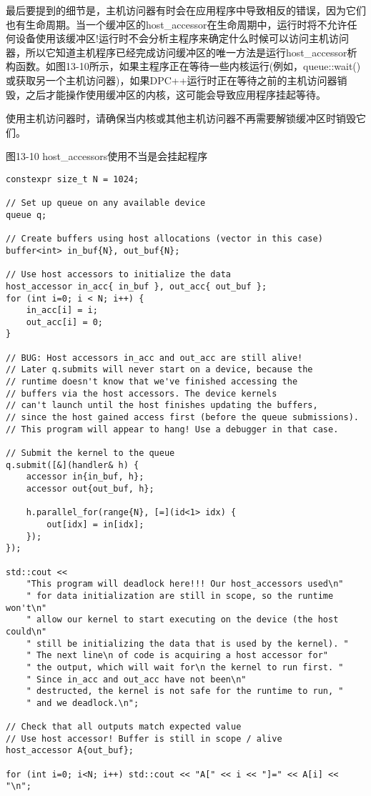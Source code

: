 最后要提到的细节是，主机访问器有时会在应用程序中导致相反的错误，因为它们也有生命周期。当一个缓冲区的host\_accessor在生命周期中，运行时将不允许任何设备使用该缓冲区!运行时不会分析主程序来确定什么时候可以访问主机访问器，所以它知道主机程序已经完成访问缓冲区的唯一方法是运行host\_accessor析构函数。如图13-10所示，如果主程序正在等待一些内核运行(例如，queue::wait()或获取另一个主机访问器)，如果DPC++运行时正在等待之前的主机访问器销毁，之后才能操作使用缓冲区的内核，这可能会导致应用程序挂起等待。\par

\begin{tcolorbox}[colback=red!5!white,colframe=red!75!black]
使用主机访问器时，请确保当内核或其他主机访问器不再需要解锁缓冲区时销毁它们。
\end{tcolorbox}

\hspace*{\fill} \par %
图13-10 host\_accessors使用不当是会挂起程序
\begin{lstlisting}[caption={}]
constexpr size_t N = 1024;

// Set up queue on any available device
queue q;

// Create buffers using host allocations (vector in this case)
buffer<int> in_buf{N}, out_buf{N};

// Use host accessors to initialize the data
host_accessor in_acc{ in_buf }, out_acc{ out_buf };
for (int i=0; i < N; i++) {
	in_acc[i] = i;
	out_acc[i] = 0;
}

// BUG: Host accessors in_acc and out_acc are still alive!
// Later q.submits will never start on a device, because the
// runtime doesn't know that we've finished accessing the
// buffers via the host accessors. The device kernels
// can't launch until the host finishes updating the buffers,
// since the host gained access first (before the queue submissions).
// This program will appear to hang! Use a debugger in that case.

// Submit the kernel to the queue
q.submit([&](handler& h) {
	accessor in{in_buf, h};
	accessor out{out_buf, h};
	
	h.parallel_for(range{N}, [=](id<1> idx) {
		out[idx] = in[idx];
	});
});

std::cout <<
	"This program will deadlock here!!! Our host_accessors used\n"
	" for data initialization are still in scope, so the runtime won't\n"
	" allow our kernel to start executing on the device (the host could\n"
	" still be initializing the data that is used by the kernel). "
	" The next line\n of code is acquiring a host accessor for"
	" the output, which will wait for\n the kernel to run first. "
	" Since in_acc and out_acc have not been\n"
	" destructed, the kernel is not safe for the runtime to run, "
	" and we deadlock.\n";
	
// Check that all outputs match expected value
// Use host accessor! Buffer is still in scope / alive
host_accessor A{out_buf};

for (int i=0; i<N; i++) std::cout << "A[" << i << "]=" << A[i] << "\n";
\end{lstlisting}
